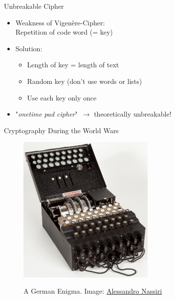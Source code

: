 \documentclass[]{beamer}
\begin{document}
\begin{frame}{Unbreakable Cipher}
	\begin{itemize}
		\item<1-> Weakness of Vigenère-Cipher:\\ Repetition of code word (= key)
		\item<2-> Solution: 
		\begin{itemize}
			\item<2-> Length of key = length of text
			\item<3-> Random key (don't use words or lists)
			\item<4-> Use each key only once
		\end{itemize}
		\item<5-> "\textit{onetime pad cipher}"\ \(\rightarrow\) theoretically unbreakable!
	\end{itemize}
\end{frame}

\begin{frame}{Cryptography During the World Wars}
	\begin{figure}
		\centering
		\includegraphics[width = 0.6\textwidth]{../assets/images/image_enigma}
		\label{fig:Enigma}
		\caption{A German Enigma. Image: \href{https://de.wikipedia.org/wiki/Datei:Enigma_(crittografia)_-_Museo_scienza_e_tecnologia_Milano.jpg}{Alessandro Nassiri}}
	\end{figure}
\end{frame}
\end{document}
